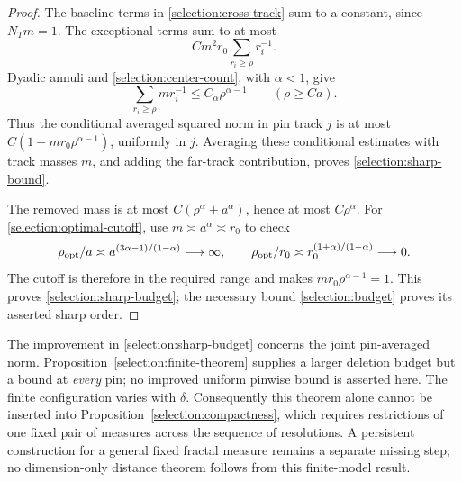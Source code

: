 \begin{proof}
The baseline terms in \eqref{selection:cross-track} sum to a constant,
since \(N_Tm=1\). The exceptional terms sum to at most
\[
 Cm^2r_0\sum_{r_i\ge\rho}r_i^{-1}.
\]
Dyadic annuli and \eqref{selection:center-count}, with \(\alpha<1\),
give
\[
 \sum_{r_i\ge\rho}m r_i^{-1}\le C_\alpha\rho^{\alpha-1}
 \qquad(\rho\ge Ca).
\]
Thus the conditional averaged squared norm in pin track \(j\) is at
most \(C(1+mr_0\rho^{\alpha-1})\), uniformly in \(j\). Averaging
these conditional estimates with track masses \(m\), and adding the
far-track contribution, proves \eqref{selection:sharp-bound}.

The removed mass is at most \(C(\rho^\alpha+a^\alpha)\), hence at
most \(C\rho^\alpha\). For \eqref{selection:optimal-cutoff}, use
\(m\asymp a^\alpha\asymp r_0\) to check
\[
 \rho_{\rm opt}/a\asymp
       a^{(3\alpha-1)/(1-\alpha)}\longrightarrow\infty,
 \qquad
 \rho_{\rm opt}/r_0\asymp
       r_0^{(1+\alpha)/(1-\alpha)}\longrightarrow0.
\]
The cutoff is therefore in the required range and makes
\(mr_0\rho^{\alpha-1}=1\). This proves
\eqref{selection:sharp-budget}; the necessary bound
\eqref{selection:budget} proves its asserted sharp order.
\end{proof}

The improvement in \eqref{selection:sharp-budget} concerns the joint
pin-averaged norm. Proposition~\ref{selection:finite-theorem} supplies
a larger deletion budget but a bound at \emph{every} pin; no improved
uniform pinwise bound is asserted here. The finite configuration varies
with \(\delta\). Consequently this theorem alone cannot be inserted
into Proposition~\ref{selection:compactness}, which requires restrictions
of one fixed pair of measures across the sequence of resolutions.
A persistent construction for a general fixed fractal measure remains a
separate missing step; no dimension-only distance theorem follows from
this finite-model result.

